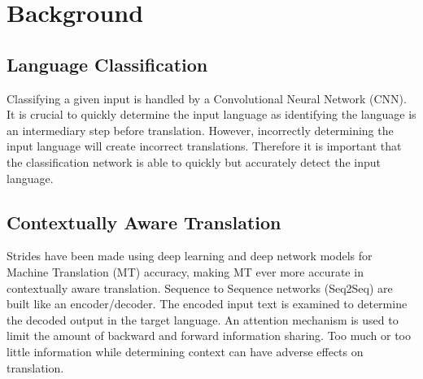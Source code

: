 \documentclass[10pt,a4paper]{report}
\begin{document}
\clearpage

\section{Background}

\subsection{Language Classification}
Classifying a given input is handled by a Convolutional Neural Network (CNN). It is crucial to quickly determine the input language as identifying the language is an intermediary step before translation. However, incorrectly determining the input language will create incorrect translations. Therefore it is important that the classification network is able to quickly but accurately detect the input language.

\subsection{Contextually Aware Translation}
Strides have been made using deep learning and deep network models for Machine Translation (MT) accuracy, making MT ever more accurate in contextually aware translation. Sequence to Sequence networks (Seq2Seq) are built like an encoder/decoder. The encoded input text is examined to determine the decoded output in the target language. An attention mechanism is used to limit the amount of backward and forward information sharing. Too much or too little information while determining context can have adverse effects on translation. 
\end{document}
